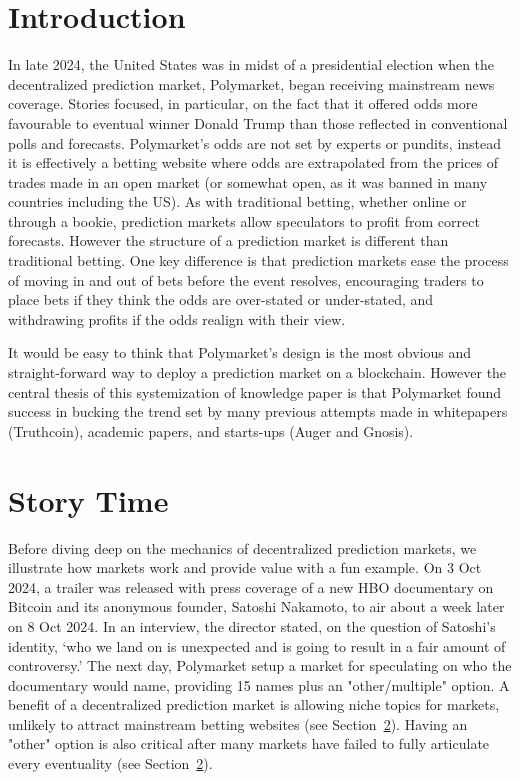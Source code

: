 \section{Introduction}

In late 2024, the United States was in midst of a presidential election when the decentralized prediction market, Polymarket, began receiving mainstream news coverage. Stories focused, in particular, on the fact that it offered odds more favourable to eventual winner Donald Trump than those reflected in conventional polls and forecasts. Polymarket's odds are not set by experts or pundits, instead it is effectively a betting website where odds are extrapolated from the prices of trades made in an open market (or somewhat open, as it was banned in many countries including the US). As with traditional betting, whether online or through a bookie, prediction markets allow speculators to profit from correct forecasts. However the structure of a prediction market is different than traditional betting. One key difference is that prediction markets ease the process of moving in and out of bets before the event resolves, encouraging traders to place bets if they think the odds are over-stated or under-stated, and withdrawing profits if the odds realign with their view. 

It would be easy to think that Polymarket's design is the most obvious and straight-forward way to deploy a prediction market on a blockchain. However the central thesis of this systemization of knowledge paper is that Polymarket found success in bucking the trend set by many previous attempts made in whitepapers (Truthcoin), academic papers, and starts-ups (Auger and Gnosis). 





\section{Story Time}

Before diving deep on the mechanics of decentralized prediction markets, we illustrate how markets work and provide value with a fun example. On 3 Oct 2024, a trailer was released with press coverage of a new HBO documentary on Bitcoin and its anonymous founder, Satoshi Nakamoto, to air about a week later on 8 Oct 2024. In an interview, the director stated, on the question of Satoshi's identity, `who we land on is unexpected and
is going to result in a fair amount of controversy.' The next day, Polymarket setup a market for speculating on who the documentary would name, providing 15 names plus an "other/multiple" option. A benefit of a decentralized prediction market is allowing niche topics for markets, unlikely to attract mainstream betting websites (see Section~\ref{}). Having an "other" option is also critical after many markets have failed to fully articulate every eventuality (see Section~\ref{}).

